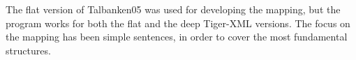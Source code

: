 \documentclass[10pt, a4paper]{article}
\begin{document}
The flat version of Talbanken05 was used for developing the mapping, but
the program works for both the flat and the deep Tiger-XML versions.
The focus on the mapping has been simple sentences, in order to cover the most
fundamental structures. 
\end{document}
